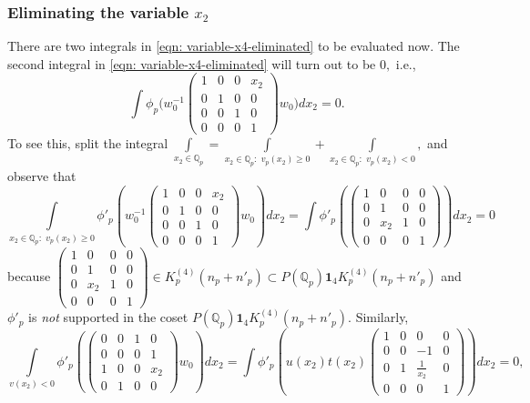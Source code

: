 \documentclass[11pt]{amsart}
\newcommand{\mirp}[1]{K_p^{(4)}(#1)}
\begin{document}
\medskip
\subsubsection{Eliminating the variable $x_2$}
There are two integrals in \eqref{eqn: variable-x4-eliminated} to be evaluated now. 
The second integral in \eqref{eqn: variable-x4-eliminated} will turn out to be $0,$ i.e.,
\begin{equation}
	\int \phi_p \biggl( w_0^{-1}\left(\begin{smallmatrix}
		1 & 0 & 0 & x_2 \\
		0 & 1 & 0 & 0 \\
		0 & 0 & 1 & 0 \\
		0 & 0 & 0 & 1
	\end{smallmatrix}\right)w_0 \biggr)dx_2 = 0. \label{eqn: integral-with-x2-w0-is-zero}
\end{equation}
To see this, split the integral $\int\limits_{x_2 \in \mathbb{Q}_p} = \int\limits_{x_2 \in \mathbb{Q}_p:\,\, v_p(x_2) \geq 0} + \int\limits_{x_2 \in \mathbb{Q}_p:\,\, v_p(x_2) < 0},$ 
and observe that 
$$
	\int\limits_{x_2 \in \mathbb{Q}_p:\,\, v_p(x_2) \geq 0} \phi'_p\left(w_0^{-1} \left(\begin{smallmatrix}
		1 & 0 & 0 & x_{2} \\
		0 & 1 & 0 & 0 \\
		0 & 0 & 1 & 0 \\
		0 & 0 & 0 & 1
	\end{smallmatrix}\right) w_0  \right)  dx_2 = \int \phi'_p\left( \left(\begin{smallmatrix}
	1 & 0 & 0 & 0 \\
	0 & 1 & 0 & 0 \\
	0 & x_{2} & 1 & 0 \\
	0 & 0 & 0 & 1
	\end{smallmatrix}\right)  \right)  dx_2 = 0 
$$
because $\left(\begin{smallmatrix}
	1 & 0 & 0 & 0 \\
	0 & 1 & 0 & 0 \\
	0 & x_{2} & 1 & 0 \\
	0 & 0 & 0 & 1
\end{smallmatrix}\right) \in \mirp{n_p + n'_p} \subset P(\mathbb{Q}_p) \mathbf{1}_4 \mirp{n_p + n'_p}$ and 
$\phi'_p$ is \textit{not} supported in the coset $P(\mathbb{Q}_p) \mathbf{1}_4 \mirp{n_p + n'_p}.$ Similarly, 
\begin{equation*}
	\int\limits_{v(x_2) < 0} \phi'_p \left( \left(\begin{smallmatrix}
		0 & 0 & 1 & 0 \\
		0 & 0 & 0 & 1 \\
		1 & 0 & 0 & x_{2} \\
		0 & 1 & 0 & 0
	\end{smallmatrix}\right) w_0 \right) dx_2
	= \int \phi'_p \left( u(x_2) t(x_2)   \left(\begin{smallmatrix}
		1 & 0 & 0 & 0 \\
		0 & 0 & -1 & 0 \\
		0 & 1 & \frac{1}{x_{2}} & 0 \\
		0 & 0 & 0 & 1
	\end{smallmatrix}\right)\right) dx_2 
	= 0,
\end{equation*}
\end{document}
